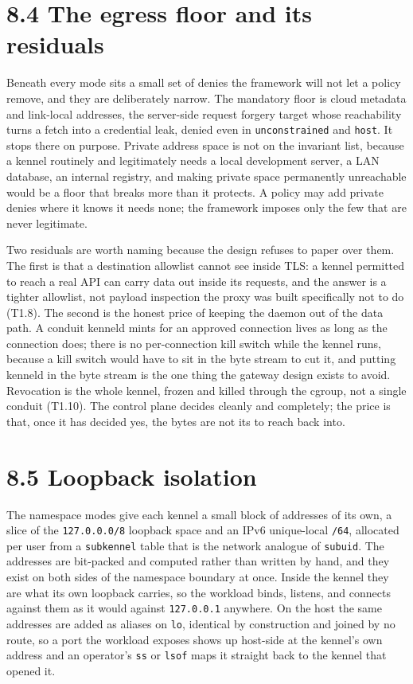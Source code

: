 \hypertarget{the-egress-floor-and-its-residuals}{%
\section{8.4 The egress floor and its
residuals}\label{the-egress-floor-and-its-residuals}}

Beneath every mode sits a small set of denies the framework will not let
a policy remove, and they are deliberately narrow. The mandatory floor
is cloud metadata and link-local addresses, the server-side request
forgery target whose reachability turns a fetch into a credential leak,
denied even in \texttt{unconstrained} and \texttt{host}. It stops there
on purpose. Private address space is not on the invariant list, because
a kennel routinely and legitimately needs a local development server, a
LAN database, an internal registry, and making private space permanently
unreachable would be a floor that breaks more than it protects. A policy
may add private denies where it knows it needs none; the framework
imposes only the few that are never legitimate.

Two residuals are worth naming because the design refuses to paper over
them. The first is that a destination allowlist cannot see inside TLS: a
kennel permitted to reach a real API can carry data out inside its
requests, and the answer is a tighter allowlist, not payload inspection
the proxy was built specifically not to do (T1.8). The second is the
honest price of keeping the daemon out of the data path. A conduit
kenneld mints for an approved connection lives as long as the connection
does; there is no per-connection kill switch while the kennel runs,
because a kill switch would have to sit in the byte stream to cut it,
and putting kenneld in the byte stream is the one thing the gateway
design exists to avoid. Revocation is the whole kennel, frozen and
killed through the cgroup, not a single conduit (T1.10). The control
plane decides cleanly and completely; the price is that, once it has
decided yes, the bytes are not its to reach back into.

\hypertarget{loopback-isolation}{%
\section{8.5 Loopback isolation}\label{loopback-isolation}}

The namespace modes give each kennel a small block of addresses of its
own, a slice of the \texttt{127.0.0.0/8} loopback space and an IPv6
unique-local \texttt{/64}, allocated per user from a \texttt{subkennel}
table that is the network analogue of \texttt{subuid}. The addresses are
bit-packed and computed rather than written by hand, and they exist on
both sides of the namespace boundary at once. Inside the kennel they are
what its own loopback carries, so the workload binds, listens, and
connects against them as it would against \texttt{127.0.0.1} anywhere.
On the host the same addresses are added as aliases on \texttt{lo},
identical by construction and joined by no route, so a port the workload
exposes shows up host-side at the kennel's own address and an operator's
\texttt{ss} or \texttt{lsof} maps it straight back to the kennel that
opened it.

